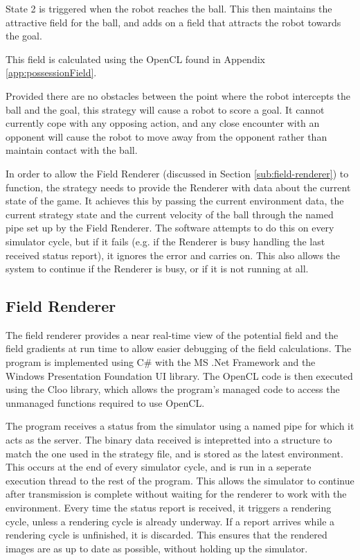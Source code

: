 \documentclass[10pt]{article}
\begin{document}
State 2 is triggered when the robot reaches the ball.  This then maintains the
attractive field for the ball, and adds on a field that attracts the robot
towards the goal.

This field is calculated using the OpenCL found in Appendix
\ref{app:possessionField}.

Provided there are no obstacles between the point where the robot intercepts the
ball and the goal, this strategy will cause a robot to score a goal.  It cannot
currently cope with any opposing action, and any close encounter with an
opponent will cause the robot to move away from the opponent rather than
maintain contact with the ball.

In order to allow the Field Renderer (discussed in Section
\ref{sub:field-renderer}) to function, the strategy needs to provide the
Renderer with data about the current state of the game.  It achieves this by
passing the current environment data, the current strategy state and the current
velocity of the ball through the named pipe set up by the Field Renderer.  The
software attempts to do this on every simulator cycle, but if it fails (e.g. if
the Renderer is busy handling the last received status report), it ignores the
error and carries on.  This also allows the system to continue if the Renderer
is busy, or if it is not running at all.

\subsection{Field Renderer\label{sub:field-renderer}}

The field renderer provides a near real-time view of the potential field and the
field gradients at run time to allow easier debugging of the field calculations.
The program is implemented using C\# with the MS .Net Framework and the Windows
Presentation Foundation UI library. The OpenCL code is then executed using the
Cloo library, which allows the program's managed code to access the unmanaged
functions required to use OpenCL.

The program receives a status from the simulator using a named pipe for which it
acts as the server. The binary data received is intepretted into a structure to
match the one used in the strategy file, and is stored as the latest
environment. This occurs at the end of every simulator cycle, and is run in a
seperate execution thread to the rest of the program. This allows the simulator
to continue after transmission is complete without waiting for the renderer to
work with the environment. Every time the status report is received, it triggers
a rendering cycle, unless a rendering cycle is already underway. If a report
arrives while a rendering cycle is unfinished, it is discarded. This ensures
that the rendered images are as up to date as possible, without holding up the
simulator.
\end{document}
